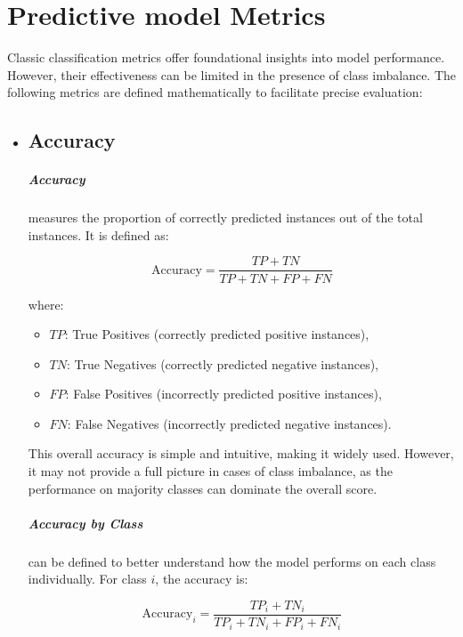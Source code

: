\chapter{Predictive model Metrics}
\label{appendix:predictive_model_metrics}

Classic classification metrics offer foundational insights into model performance. However, their effectiveness can be limited in the presence of class imbalance. The following metrics are defined mathematically to facilitate precise evaluation:

\begin{itemize}
\item \section{Accuracy}
\label{subsubsec:accuracy}

\paragraph{Accuracy} measures the proportion of correctly predicted instances out of the total instances. It is defined as:

\[
    \text{Accuracy} = \frac{TP + TN}{TP + TN + FP + FN}
    \label{eq:accuracy}
\]

where:
\begin{itemize}
    \item $TP$: True Positives (correctly predicted positive instances),
    \item $TN$: True Negatives (correctly predicted negative instances),
    \item $FP$: False Positives (incorrectly predicted positive instances),
    \item $FN$: False Negatives (incorrectly predicted negative instances).
\end{itemize}

This overall accuracy is simple and intuitive, making it widely used. However, it may not provide a full picture in cases of class imbalance, as the performance on majority classes can dominate the overall score.

\paragraph{Accuracy by Class} can be defined to better understand how the model performs on each class individually. For class $i$, the accuracy is:

\[
    \text{Accuracy}_i = \frac{TP_i + TN_i}{TP_i + TN_i + FP_i + FN_i}
\]


\end{itemize}
